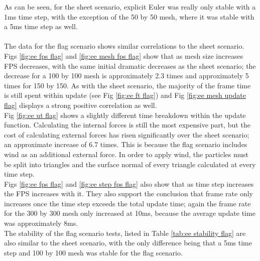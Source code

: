 As can be seen, for the sheet scenario, explicit Euler was really only stable with a 1ms time step, with the exception of the 50 by 50 mesh, where it was stable with a 5ms time step as well.
\\\\The data for the flag scenario shows similar correlations to the sheet scenario. Figs \ref{fig:ee fps flag} and \ref{fig:ee mesh fps flag} show that as mesh size increases FPS decreases, with the same initial dramatic decreases as the sheet scenario; the decrease for a 100 by 100 mesh is approximately 2.3 times and approximately 5 times for 150 by 150. As with the sheet scenario, the majority of the frame time is still spent within update (see Fig \ref{fig:ee ft flag}) and Fig \ref{fig:ee mesh update flag} displays a strong positive correlation as well.
\\Fig \ref{fig:ee ut flag} shows a slightly different time breakdown within the update function. Calculating the internal forces is still the most expensive part, but the cost of calculating external forces has risen significantly over the sheet scenario; an approximate increase of 6.7 times. This is because the flag scenario includes wind as an additional external force. In order to apply wind, the particles must be split into triangles and the surface normal of every triangle calculated at every time step.
\\Figs \ref{fig:ee fps flag} and \ref{fig:ee step fps flag} also show that as time step increases the FPS increases with it. They also support the conclusion that frame rate only increases once the time step exceeds the total update time; again the frame rate for the 300 by 300 mesh only increased at 10ms, because the average update time was approximately 8ms.
\\The stability of the flag scenario tests, listed in Table \ref{tab:ee stability flag} are also similar to the sheet scenario, with the only difference being that a 5ms time step and 100 by 100 mesh was stable for the flag scenario.

